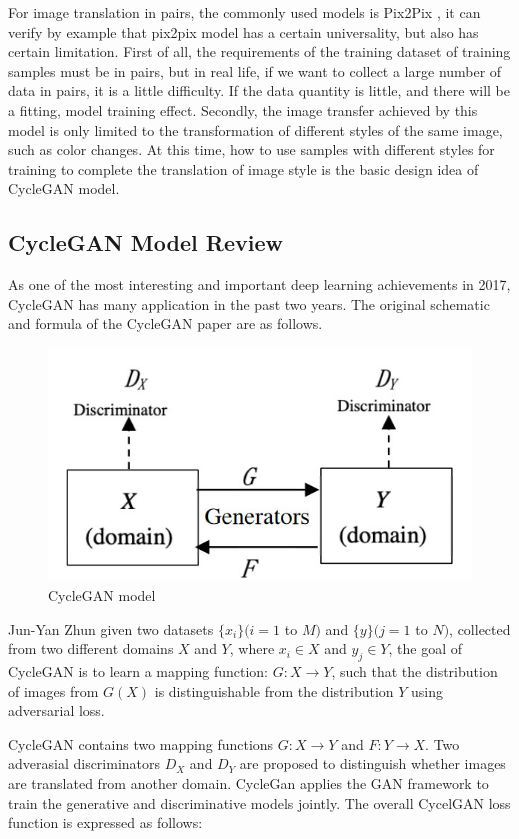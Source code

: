 \documentclass[peerreview]{IEEEtran}
\begin{document}
For image translation in pairs, the commonly used models is Pix2Pix \cite{isola2017image}, it can verify by example that pix2pix model has a certain universality, but also has certain limitation. First of all, the requirements of the training dataset of training samples must be in pairs, but in real life, if we want to collect a large number of data in pairs, it is a little diﬃculty. If the data quantity is little, and there will be a fitting, model training eﬀect. Secondly, the image transfer achieved by this model is only limited to the transformation of diﬀerent styles of the same image, such as color changes. At this time, how to use samples with diﬀerent styles for training to complete the translation of image style is the basic design idea of CycleGAN model.

\subsection{CycleGAN Model Review}
As one of the most interesting and important deep learning achievements in 2017, CycleGAN has many application in the past two years. The original schematic and formula of the CycleGAN paper are as follows.

\begin{figure}[H]
    \centering
    \includegraphics[width=0.8\columnwidth]{CycleGAN Model}
    \caption{CycleGAN model}
    \label{fig:s=cyclegan_model}
\end{figure}

Jun-Yan Zhun \cite{zhu2017unpaired} given two datasets $\{x_i\}(i=1$ to $M)$ and $\{y\}(j=1$ to $N)$, collected from two different domains $X$ and $Y$, where $x_i \in X$ and $y_j \in Y$, the goal of CycleGAN is to learn a mapping function: $G:X \to Y$, such that the distribution of images from $G(X)$ is distinguishable from the distribution $Y$ using adversarial loss.

CycleGAN contains two mapping functions $G:X \to Y$ and $F:Y \to X$. Two adverasial discriminators $D_X$ and $D_Y$ are proposed to distinguish whether images are translated from another domain. CycleGan applies the GAN framework to train the generative and discriminative models jointly. The overall CycelGAN loss function is expressed as follows: 
\end{document}
